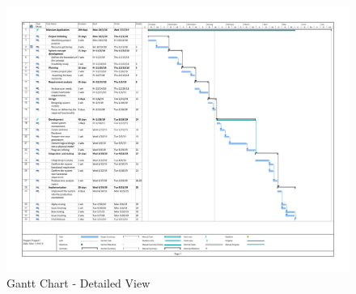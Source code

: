 \documentclass{scrreprt}
\begin{document}
\clearpage
\begin{figure}[ht!]
    \centering
    \includegraphics[angle=90, height=\textheight]{gantt/gantt_scale.pdf}
    \caption{Gantt Chart - Detailed View}
    \label{fig:gantt2}
\end{figure}




\end{document}
